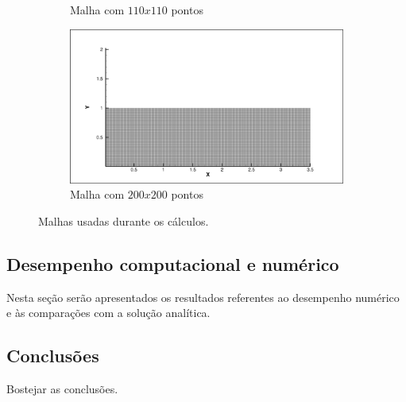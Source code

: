 \documentclass[a4paper, twoside, 12pt]{article}
\numberwithin{equation}{section}
\begin{document}
\begin{figure}[H]
\begin{subfigure}{.5\textwidth}
        \caption{Malha com $110x110$ pontos}
        \label{fig:sfig1}
        \end{subfigure}%
        \begin{subfigure}{.5\textwidth}
        \centering
        \includegraphics[width=.9\linewidth]{pics/mesh_200200.png}
        \caption{Malha com $200x200$ pontos}
        \label{fig:sfig2}
        \end{subfigure}

        \caption{Malhas usadas durante os cálculos.}
        \label{fig:fig}
        \vspace*{-5pt}
        \end{figure}

    \subsection{Desempenho computacional e numérico}
Nesta seção serão apresentados os resultados referentes ao desempenho numérico e às comparações com a solução analítica.

\subsection{Conclusões}

Bostejar as conclusões.


\end{document}
